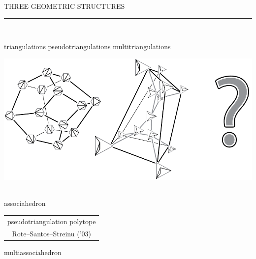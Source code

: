 \documentclass[12pt,titlepage,landscape,a4paper]{article}
\newcommand{\textemoyen}{\fontsize{23}{27}\selectfont}
\newenvironment{slide}[1]
{
\newpage
\begin{center}
{\blue \textemoyen \uppercase{#1}}\\
\end{center}
\vspace{-1cm}
\rule{\textwidth}{0.5 pt}\\
\vspace{-.8cm}
}
{\vspace*{-3cm}}
\newcommand{\violet}{\color{violet}} %
\newcommand{\blue}{\color{blue}} %
\newcommand{\papier}[1]{{\violet\fontsize{15}{20}\selectfont #1}} %
\renewcommand{\emph}[1]{\uline{#1}}
\begin{document}
\begin{slide}{Three geometric structures}

\hspace{1.6cm} triangulations \hspace{3.4cm} pseudotriangulations \hspace{2.5cm} multitriangulations
\begin{center}\includegraphics[width=.95\textwidth]{geometricStructures4}\hspace*{1.5cm}~\end{center}
\hspace{1.5cm} associahedron \hspace{2.4cm} \begin{tabular}[t]{c}pseudotriangulation polytope \\  \papier{Rote--Santos--Streinu ('03)} \end{tabular} \hspace{1cm} multiassociahedron

\vspace{-1cm}
\end{slide}

%
%
\end{document}
